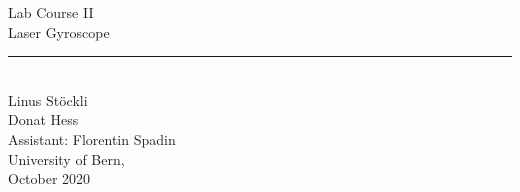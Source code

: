 \begin{center}
    \vspace*{\fill} %
    \LARGE{Lab Course II} \\
    \vspace{5mm}
    \Huge{Laser Gyroscope} \\
    \rule{10cm}{1pt} \\
    \vspace{2cm}
    \Large{Linus Stöckli \\Donat Hess} \\
    \vspace{1cm}
    \Large{Assistant: Florentin Spadin} \\
    \vspace{1cm}
    \Large{University of Bern, \\ October 2020}
    \vspace*{\fill} %
\end{center}